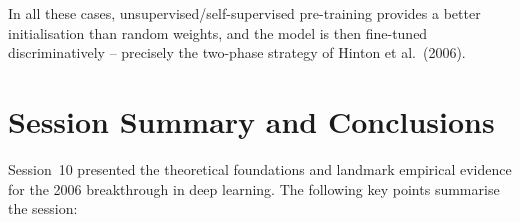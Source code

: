 \documentclass[12pt,a4paper]{article}
\begin{document}
In all these cases, unsupervised/self-supervised pre-training provides a
better initialisation than random weights, and the model is then fine-tuned
discriminatively -- precisely the two-phase strategy of Hinton et al.\ (2006).

\newpage

\section{Session Summary and Conclusions}
\label{sec:summary}

Session~10 presented the theoretical foundations and landmark empirical
evidence for the 2006 breakthrough in deep learning.  The following key
points summarise the session:
\end{document}
